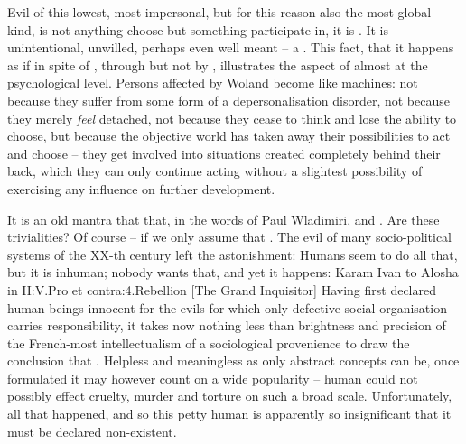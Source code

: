 \pa
Evil of this lowest, most impersonal, but for this reason also the most
global kind, is not anything  choose but something  participate in,
it is . It is unintentional, unwilled, perhaps even well
meant -- a . This fact, that
it happens as if in spite of , through  but 
not by , illustrates the aspect of  almost at the
psychological level. Persons affected by Woland become like machines: not
because they suffer from some form of a %
depersonalisation disorder, not because they merely {\em feel} detached, not 
because they cease to think and lose the ability to choose, but because the
objective world has taken away 
their possibilities to act and choose -- they get involved into situations created
completely behind their back, which they can only continue acting without
a slightest possibility of exercising any influence on further development.


It is an old mantra that 
that, in the words of Paul Wladimiri,  and .
Are these trivialities? Of course -- if we only assume that . The evil of many socio-political systems of the XX-th century left the
astonishment: 
Humans seem to do all that, but it is inhuman; nobody wants that, and yet it
happens: \citet{all I know is that there is suffering and that there is none
  guilty.}{Karam}{ Ivan to Alosha in II:V.Pro et contra:4.Rebellion [The Grand
  Inquisitor]}
Having first declared human beings innocent for the evils for which only
defective social organisation carries responsibility, 
it takes now nothing less than brightness and precision of the French-most 
intellectualism of a sociological provenience to draw the conclusion that 
. Helpless and meaningless as only abstract
concepts can be, once formulated it may however count on a wide popularity
-- human  could not possibly effect cruelty, murder and torture on
such a broad scale.   Unfortunately, all that happened,
and so this petty human  is apparently so insignificant that it
must be declared non-existent.

